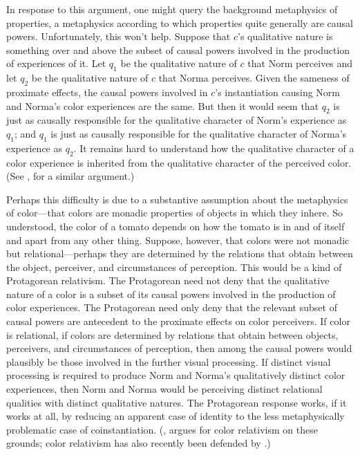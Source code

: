 \documentclass[12pt]{article}
\begin{document}
In response to this argument, one might query the background metaphysics of properties, a metaphysics according to which properties quite generally are causal powers. Unfortunately, this won't help. Suppose that \( c \)'s qualitative nature is something over and above the subset of causal powers involved in the production of experiences of it. Let \( q_1 \) be the qualitative nature of \( c \) that Norm perceives and let \( q_2 \) be the qualitative nature of \( c \) that Norma perceives. Given the sameness of proximate effects, the causal powers involved in \( c \)'s instantiation causing Norm and Norma's color experiences are the same. But then it would seem that \( q_2 \) is just as causally responsible for the qualitative character of Norm's experience as \( q_1 \); and \( q_1 \) is just as causally responsible for the qualitative character of Norma's experience as \( q_2 \). It remains hard to understand how the qualitative character of a color experience is inherited from the qualitative character of the perceived color. (See \citealp{Johnston:2005dq}, for a similar argument.)

Perhaps this difficulty is due to a substantive assumption about the metaphysics of color---that colors are monadic properties of objects in which they inhere. So understood, the color of a tomato depends on how the tomato is in and of itself and apart from any other thing. Suppose, however, that colors were not monadic but relational---perhaps they are determined by the relations that obtain between the object, perceiver, and circumstances of perception. This would be a kind of Protagorean relativism. The Protagorean need not deny that the qualitative nature of a color is a subset of its causal powers involved in the production of color experiences. The Protagorean need only deny that the relevant subset of causal powers are antecedent to the proximate effects on color perceivers. If color is relational, if colors are determined by relations that obtain between objects, perceivers, and circumstances of perception, then among the causal powers would plausibly be those involved in the further visual processing. If distinct visual processing is required to produce Norm and Norma's qualitatively distinct color experiences, then Norm and Norma would be perceiving distinct relational qualities with distinct qualitative natures. The Protagorean response works, if it works at all, by reducing an apparent case of identity to the less metaphysically problematic case of coinstantiation. (\citealp{Johnston:2005dq}, argues for color relativism on these grounds; color relativism has also recently been defended by \citealp{Cohen:vl,McLaughlin:2003cr}.)
\end{document}
